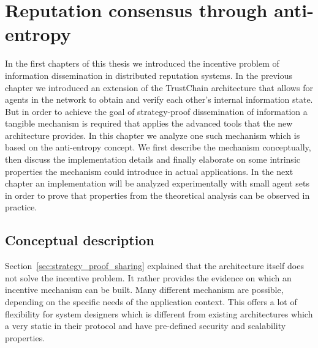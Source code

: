 \chapter{Reputation consensus through anti-entropy}
\label{chap:mechanism}

In the first chapters of this thesis we introduced the incentive problem of information dissemination 
in distributed reputation systems. In the previous chapter we introduced an extension of the TrustChain
architecture that allows for agents in the network to obtain and verify each other's internal 
information state. But in order to achieve the goal of strategy-proof dissemination of information
a tangible mechanism is required that applies the advanced tools that the new architecture provides.
In this chapter we analyze one such mechanism which is based on the anti-entropy concept. We first
describe the mechanism conceptually, then discuss the implementation details and finally elaborate
on some intrinsic properties the mechanism could introduce in actual applications. In the next
chapter an implementation will be analyzed experimentally with small agent sets in order to prove
that properties from the theoretical analysis can be observed in practice.

\section{Conceptual description}



Section~\ref{sec:strategy_proof_sharing} explained that the architecture itself does not solve the 
incentive problem. It rather provides the evidence on which an incentive mechanism can be built. 
Many different mechanism are possible, depending on the specific needs of the application context. 
This offers a lot of flexibility for system designers which is different from existing architectures
which a very static in their protocol and have pre-defined security and scalability properties.


